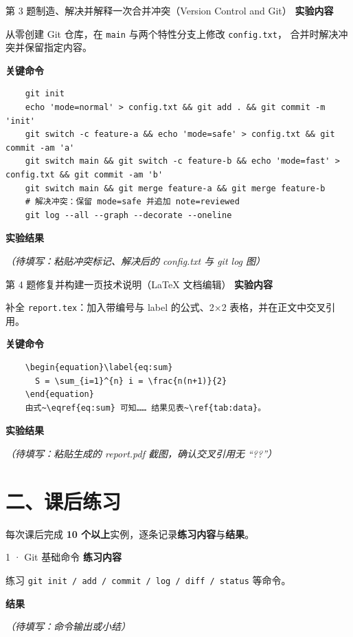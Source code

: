 \documentclass[UTF8, zihao=-4]{ctexart}
\newcommand{\contenthead}[1]{%
  \medskip\noindent\textcolor{cprimary}{\bfseries #1}\par\smallskip
}
\newcommand{\todo}[1]{\textcolor{caccent}{\emph{（待填写：#1）}}}
\begin{document}
\begin{experiment}{第 3 题}{制造、解决并解释一次合并冲突（Version Control and Git）}
  \contenthead{实验内容}
  从零创建 Git 仓库，在 \texttt{main} 与两个特性分支上修改 \texttt{config.txt}，
  合并时解决冲突并保留指定内容。

  \contenthead{关键命令}
  \begin{verbatim}
    git init
    echo 'mode=normal' > config.txt && git add . && git commit -m 'init'
    git switch -c feature-a && echo 'mode=safe' > config.txt && git commit -am 'a'
    git switch main && git switch -c feature-b && echo 'mode=fast' > config.txt && git commit -am 'b'
    git switch main && git merge feature-a && git merge feature-b
    # 解决冲突：保留 mode=safe 并追加 note=reviewed
    git log --all --graph --decorate --oneline
  \end{verbatim}

  \contenthead{实验结果}
  \todo{粘贴冲突标记、解决后的 config.txt 与 git log 图}
\end{experiment}

\begin{experiment}{第 4 题}{修复并构建一页技术说明（LaTeX 文档编辑）}
  \contenthead{实验内容}
  补全 \texttt{report.tex}：加入带编号与 label 的公式、2×2 表格，并在正文中交叉引用。

  \contenthead{关键命令}
  \begin{verbatim}
    \begin{equation}\label{eq:sum}
      S = \sum_{i=1}^{n} i = \frac{n(n+1)}{2}
    \end{equation}
    由式~\eqref{eq:sum} 可知…… 结果见表~\ref{tab:data}。
  \end{verbatim}

  \contenthead{实验结果}
  \todo{粘贴生成的 report.pdf 截图，确认交叉引用无 “??”}
\end{experiment}

\section*{二、课后练习}

每次课后完成 \textbf{10 个以上}实例，逐条记录\textbf{练习内容}与\textbf{结果}。

\begin{exercise}{1 · Git 基础命令}
  \contenthead{练习内容}
  练习 \texttt{git init / add / commit / log / diff / status} 等命令。

  \contenthead{结果}
  \todo{命令输出或小结}
\end{exercise}
\end{document}
